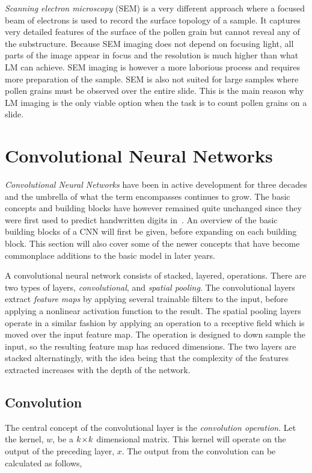 \textit{Scanning electron microscopy} (SEM) is a very different approach where a focused beam of electrons is used to record the surface topology of a sample.
It captures very detailed features of the surface of the pollen grain but cannot reveal any of the substructure.
Because SEM imaging does not depend on focusing light, all parts of the image appear in focus and the resolution is much higher than what LM can achieve.
SEM imaging is however a more laborious process and requires more preparation of the sample.
SEM is also not suited for large samples where pollen grains must be observed over the entire slide.
This is the main reason why LM imaging is the only viable option when the task is to count pollen grains on a slide.

\section{Convolutional Neural Networks}\label{sec:back-cnn}
\emph{Convolutional Neural Networks} have been in active development for three decades and the umbrella of what the term encompasses continues to grow.
The basic concepts and building blocks have however remained quite unchanged since they were first used to predict handwritten digits in\ \textcite{1989Hdrw}.
An overview of the basic building blocks of a CNN will first be given, before expanding on each building block.
This section will also cover some of the newer concepts that have become commonplace additions to the basic model in later years.

A convolutional neural network consists of stacked, layered, operations.
There are two types of layers, \textit{convolutional}, and \textit{spatial pooling}.
The convolutional layers extract \textit{feature maps} by applying several trainable filters to the input, before applying a nonlinear activation function to the result.
The spatial pooling layers operate in a similar fashion by applying an operation to a receptive field which is moved over the input feature map.
The operation is designed to down sample the input, so the resulting feature map has reduced dimensions.
The two layers are stacked alternatingly, with the idea being that the complexity of the features extracted increases with the depth of the network.

\subsection{Convolution}

The central concept of the convolutional layer is the \textit{convolution operation}.
Let the kernel, \(w\), be a \(k\!\times \! k\) dimensional matrix.
This kernel will operate on the output of the preceding layer, \(x\).
The output from the convolution can be calculated as follows,

